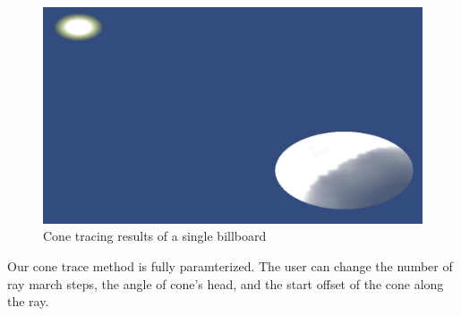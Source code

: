 \begin{figure}[h]
\centering
\includegraphics[width=\textwidth]{../res/conetrace.png}
\caption{Cone tracing results of a single billboard}
\end{figure}

Our cone trace method is fully paramterized. The user can change the number of ray march steps, the angle of cone's head, and the start offset of the cone along the ray. 

